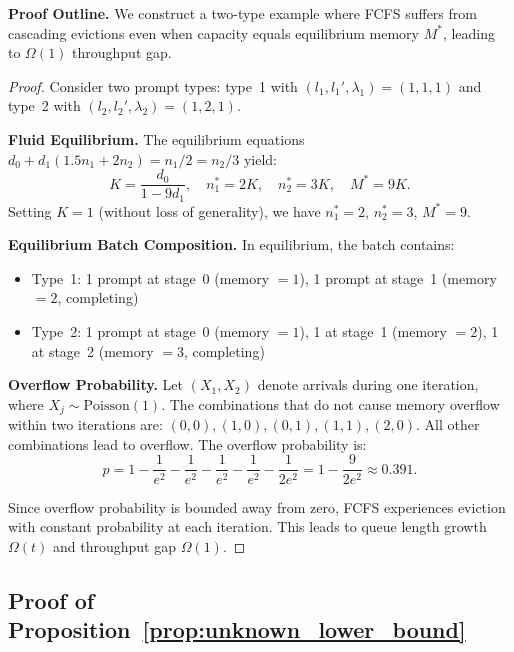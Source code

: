 \noindent\textbf{Proof Outline.} We construct a two-type example where FCFS suffers from cascading evictions even when capacity equals equilibrium memory $M^*$, leading to $\Omega(1)$ throughput gap.

\begin{proof}
Consider two prompt types: type~1 with $(l_1, l_1', \lambda_1) = (1, 1, 1)$ and type~2 with $(l_2, l_2', \lambda_2) = (1, 2, 1)$.

\textbf{Fluid Equilibrium.} The equilibrium equations $d_0 + d_1(1.5n_1 + 2n_2) = n_1/2 = n_2/3$ yield:
$$K = \frac{d_0}{1-9d_1}, \quad n_1^* = 2K, \quad n_2^* = 3K, \quad M^* = 9K.$$
Setting $K = 1$ (without loss of generality), we have $n_1^* = 2$, $n_2^* = 3$, $M^* = 9$.

\textbf{Equilibrium Batch Composition.} In equilibrium, the batch contains:
\begin{itemize}
\item Type~1: 1 prompt at stage~0 (memory $= 1$), 1 prompt at stage~1 (memory $= 2$, completing)
\item Type~2: 1 prompt at stage~0 (memory $= 1$), 1 at stage~1 (memory $= 2$), 1 at stage~2 (memory $= 3$, completing)
\end{itemize}

\textbf{Overflow Probability.} Let $(X_1, X_2)$ denote arrivals during one iteration, where $X_j \sim \text{Poisson}(1)$. The combinations that do not cause memory overflow within two iterations are: $(0,0), (1,0), (0,1), (1,1), (2,0)$. All other combinations lead to overflow. The overflow probability is:
$$p = 1 - \frac{1}{e^2} - \frac{1}{e^2} - \frac{1}{e^2} - \frac{1}{e^2} - \frac{1}{2e^2} = 1 - \frac{9}{2e^2} \approx 0.391.$$

Since overflow probability is bounded away from zero, FCFS experiences eviction with constant probability at each iteration. This leads to queue length growth $\Omega(t)$ and throughput gap $\Omega(1)$.
\end{proof}

\subsection{Proof of Proposition~\ref{prop:unknown_lower_bound}}
\label{appendix:proof_unknown_lower_bound}

